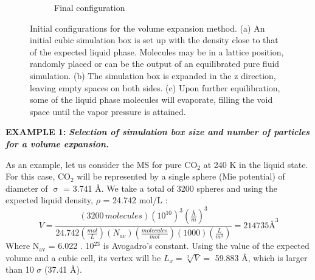 \documentclass[9pt,bestpractices]{livecoms}
\begin{document}
\begin{figure}
\begin{subfigure}{0.4\textwidth}
    \caption{Final configuration}
	\end{subfigure}
  \caption{Initial configurations for the volume expansion method. (a) An initial
cubic simulation box is set up with the density close to that of the expected
liquid phase. Molecules may be in a lattice position, randomly placed or can be
the output of an equilibrated pure fluid simulation. (b) The simulation box is
expanded in the z direction, leaving empty spaces on both sides. (c) Upon
further equilibration, some of the liquid phase molecules will evaporate,
filling the void space until the vapor pressure is attained.}
\label{fig:5}
\end{figure}

\begin{mdframed}[linewidth=0pt,backgroundcolor=LiveCoMSLightBlue!8,fontcolor=LiveCoMSDarkBlue!80!black]
\textbf{EXAMPLE 1:} \textbf{\textit{Selection of simulation box size and number of particles for a volume expansion.}}

As an example, let us consider the MS for pure CO$_{2}$ at 240 K in the liquid
state. For this case, CO$_{2}$ will be represented by a single sphere (Mie
potential) of diameter of {${\upsigma}$} = 3.741 \AA{}\citep{avendano2011}. We take a total of 3200 spheres
and using the expected liquid density, ${\rho}$ = 24.742 mol/L \citep{lemmon2013}:
\begin{equation}
V=\frac{\left(3200\,molecules\right)\left(10^{10}\right)^{3}\left(\frac{\textrm{Å}}{m}\right)^{3}}{24.742\left(\frac{mol}{L}\right)\left(N_{av}\right)\left(\frac{molecules}{mol}\right)\left(1000\right)\left(\frac{L}{m^{3}}\right)}=214735\textrm{Å}^{3}
\end{equation}
Where N$_{\mathrm{av}}$ = 6.022 . 10$^{23}$ is Avogadro's constant. Using the
value of the expected volume and a cubic cell, its vertex will be
$L_x = \sqrt[3]{V} = $ 59.883 \AA{}, which is larger than 10 $\sigma$  (37.41
\AA{}). 


\end{mdframed}
\end{document}

